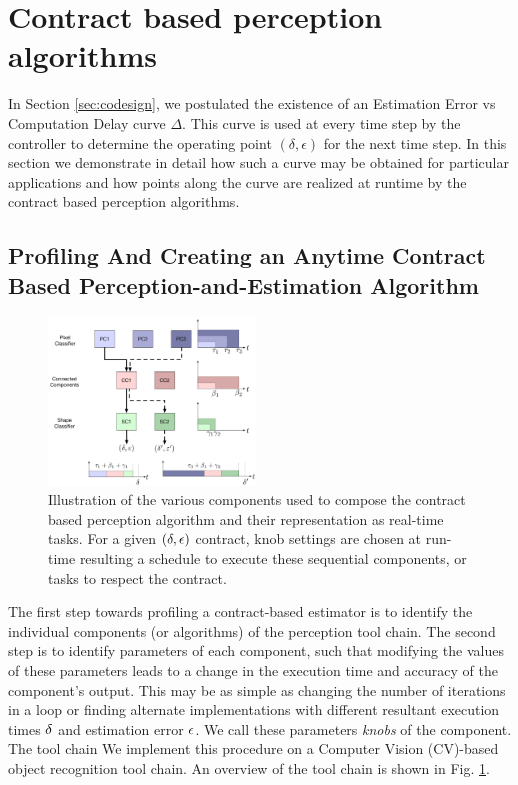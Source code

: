 \section{Contract based perception algorithms}
\label{delayErrorCurve}

In Section \ref{sec:codesign}, we postulated the existence of an Estimation Error vs Computation Delay curve $\Delta$. %
This curve is used at every time step by the controller to determine the operating point $(\delta,\epsilon)$ for the next time step.
In this section we demonstrate in detail how such a curve may be obtained for particular applications and how points along the curve are realized at runtime by the contract based perception algorithms.

\subsection{Profiling And Creating an Anytime Contract Based Perception-and-Estimation Algorithm}
\begin{figure}[htbp]
	\centering
	\includegraphics[width=0.49\textwidth]{figures/omnigraffle_figures/real_time_figure}
	\caption{Illustration of the various components used to compose the contract based perception algorithm and their representation as real-time tasks. For a given $(\delta,\epsilon)$ contract, knob settings are chosen at run-time resulting a schedule to execute these sequential components, or tasks to respect the contract.}
	\label{fig:RT_bs}
\end{figure}
The first step towards profiling a contract-based estimator is to identify the individual components (or algorithms) of the perception tool chain. 
The second step is to identify parameters of each component, such that modifying the values of these parameters leads to a change in the execution time and accuracy of the component's output.
This may be as simple as changing the number of iterations in a loop \cite{loop-perf} or finding alternate implementations with different resultant execution times $\delta$ and estimation error $\epsilon$.
We call these parameters \emph{knobs} of the component.
The tool chain 
We implement this procedure on a Computer Vision (CV)-based object recognition tool chain. 
An overview of the tool chain is shown in Fig. \ref{fig:RT_bs}.

